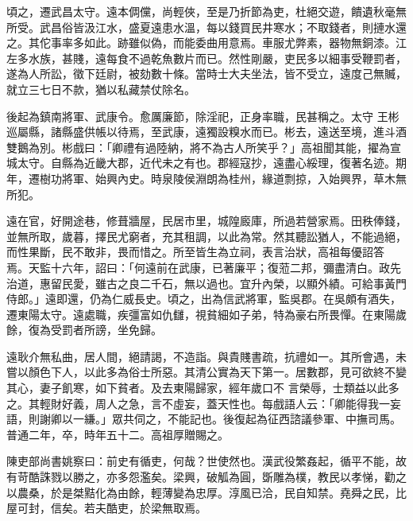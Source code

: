 \begin{pinyinscope}
 頃之，遷武昌太守。遠本倜儻，尚輕俠，至是乃折節為吏，杜絕交遊，饋遺秋毫無所受。武昌俗皆汲江水，盛夏遠患水溫，每以錢買民井寒水；不取錢者，則摙水還之。其佗事率多如此。跡雖似偽，而能委曲用意焉。車服尤弊素，器物無銅漆。江左多水族，甚賤，遠每食不過乾魚數片而已。然性剛嚴，吏民多以細事受鞭罰者，遂為人所訟，徵下廷尉，被劾數十條。當時士大夫坐法，皆不受立，遠度己無贓，就立三七日不款，猶以私藏禁仗除名。



 後起為鎮南將軍、武康令。愈厲廉節，除淫祀，正身率職，民甚稱之。太守
 王彬巡屬縣，諸縣盛供帳以待焉，至武康，遠獨設糗水而已。彬去，遠送至境，進斗酒雙鵝為別。彬戲曰：「卿禮有過陸納，將不為古人所笑乎？」高祖聞其能，擢為宣城太守。自縣為近畿大郡，近代未之有也。郡經寇抄，遠盡心綏理，復著名迹。期年，遷樹功將軍、始興內史。時泉陵侯淵朗為桂州，緣道剽掠，入始興界，草木無所犯。



 遠在官，好開途巷，修葺牆屋，民居市里，城隍廄庫，所過若營家焉。田秩俸錢，並無所取，歲暮，擇民尤窮者，充其租調，以此為常。然其聽訟猶人，不能過絕，而性果斷，民不敢非，畏而惜之。所至皆生為立祠，表言治狀，高祖每優詔答
 焉。天監十六年，詔曰：「何遠前在武康，已著廉平；復蒞二邦，彌盡清白。政先治道，惠留民愛，雖古之良二千石，無以過也。宜升內榮，以顯外績。可給事黃門侍郎。」遠即還，仍為仁威長史。頃之，出為信武將軍，監吳郡。在吳頗有酒失，遷東陽太守。遠處職，疾彊富如仇讎，視貧細如子弟，特為豪右所畏憚。在東陽歲餘，復為受罰者所謗，坐免歸。



 遠耿介無私曲，居人間，絕請謁，不造詣。與貴賤書疏，抗禮如一。其所會遇，未嘗以顏色下人，以此多為俗士所惡。其清公實為天下第一。居數郡，見可欲終不變其心，妻子飢寒，如下貧者。及去東陽歸家，經年歲口不
 言榮辱，士類益以此多之。其輕財好義，周人之急，言不虛妄，蓋天性也。每戲語人云：「卿能得我一妄語，則謝卿以一縑。」眾共伺之，不能記也。後復起為征西諮議參軍、中撫司馬。普通二年，卒，時年五十二。高祖厚贈賜之。



 陳吏部尚書姚察曰：前史有循吏，何哉？世使然也。漢武役繁姦起，循平不能，故有苛酷誅戮以勝之，亦多怨濫矣。梁興，破觚為圓，斲雕為樸，教民以孝悌，勸之以農桑，於是桀黠化為由餘，輕薄變為忠厚。淳風已洽，民自知禁。堯舜之民，比屋可封，信矣。若夫酷吏，於梁無取焉。



\end{pinyinscope}
